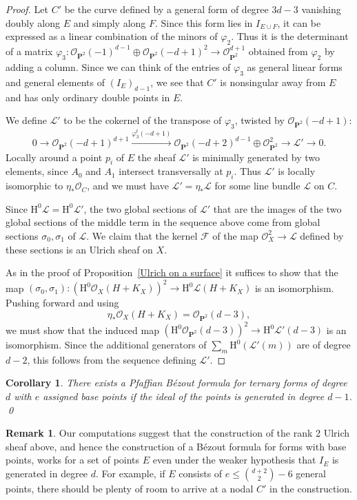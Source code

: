\documentclass{jams-l}
\newtheorem{corollary}[theorem]{Corollary}
\theoremstyle{definition}
\newtheorem{furtherwork}[theorem]{Remark}
\theoremstyle{remark}
\newcommand{\F}{{\mathcal F}}
\newcommand{\Hrm}{{\mathrm H}}
\newcommand{\cL}{{\mathcal L}}
\newcommand{\Lcal}{{\mathcal L}}
\newcommand{\Ocal}{{\mathcal O}}
\newcommand{\cO}{{\mathcal O}}
\newcommand{\PP}{{\mathbf P}}
\newcommand{\rTo}{\xrightarrow}
\newcommand{\rTox}{\rightarrow}
\begin{document}
\begin{proof}
Let $C'$ be the curve defined by a general form of degree $3d-3$
vanishing doubly along $E$ and simply along $F$. Since
this form lies in $I_{E\cup F}$, it can be expressed as a linear
combination of the minors of $\varphi_2$. Thus it is the determinant
of a matrix
$\varphi_3 : \cO_{\PP^2}(-1)^{d-1}\oplus \cO_{\PP^2}(-d+1)^2 \to \cO_{\PP^2}^{d+1}$ 
obtained from $\varphi_2$
by adding a column. Since we can think of the entries of $\varphi_3$ as
general linear forms and general elements of $(I_E)_{d-1}$,
we see that $C'$ is nonsingular away from $E$ and has only 
ordinary double points in $E$. 

We define $\Lcal'$ to be the cokernel of the
transpose of $\varphi_3$, twisted by $\Ocal_{\PP^2}(-d+1)$:
\[
0 \to \cO_{\PP^2}(-d+1)^{d+1} \rTo{\varphi_3^t(-d+1)} \cO_{\PP^2}(-d+2)^{d-1}\oplus 
\cO_{\PP^2}^2 \rTox  \cL' \to 0.
\]
Locally around a point $p_i$ of $E$ the sheaf
$\Lcal'$ is minimally
generated by two elements, since $A_0$ and $A_1$ intersect 
transversally at $p_i$. Thus $\Lcal'$ is locally isomorphic
to $\eta_*\Ocal_C$, and we must have
$\cL'=\eta_* \cL$ for some line bundle $\cL$ on $C$.

Since $\Hrm^0\Lcal=\Hrm^0\Lcal'$, the two global sections of $\Lcal'$ that are the images of
the two global sections of the middle term in the sequence above
come from global sections $\sigma_0, \sigma_1$ of $\Lcal$.
We claim that the kernel $\F$ of the map
$\Ocal_X^2\to \Lcal$ defined by these sections is an Ulrich sheaf on $X$.

As in the proof of Proposition~\ref{Ulrich on a surface} it suffices to show
that the map $(\sigma_0,\sigma_1): (\Hrm^0\Ocal_X(H+K_X))^2\to \Hrm^0\Lcal(H+K_X)$
is an isomorphism. Pushing forward and using 
\[\eta_*\Ocal_X(H+K_X)= \Ocal_{\PP^2}(d-3),\] 
we must show that the induced map 
$(\Hrm^0\Ocal_{\PP^2}(d-3))^2\to \Hrm^0\Lcal'(d-3)$
is an isomorphism.
Since the additional generators of $\sum_m \Hrm^0(\Lcal'(m))$ 
are of degree $d-2$,
this follows from the sequence defining $\Lcal'$.
\end{proof}

\begin{corollary} There exists a Pfaffian B\'ezout formula for ternary forms 
of degree $d$ with $e$ assigned base points if the ideal of the points
is generated in degree $d-1$.
\qed
\end{corollary}

\begin{furtherwork}\label{larger range} Our computations suggest that
the construction of the rank 2
Ulrich sheaf above, and hence the construction of a B\'ezout formula
for forms with base points,
works for a set of points $E$ even under the weaker hypothesis
that
 $I_E$ is generated in degree $d$. For example, if $E$ consists
of $e\le {d+2 \choose 2} -6$ general points, there 
should be plenty of room to arrive at a nodal $C'$ in the construction.
\end{furtherwork}
 
\end{document}
